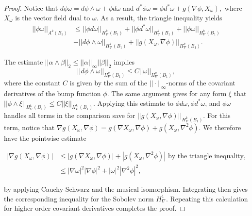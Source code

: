 \begin{proof}
Notice that $d\phi\omega = d\phi\wedge\omega + \phi d \omega$ and $d^*\phi\omega = \phi d^*\omega + g(\nabla \phi, X_{\omega}),$ where $X_{\omega}$ is the vector field dual to $\omega$.
As a result, the triangle inequality yields \begin{align*}
||\phi\omega||_{A^k(B_1)} &\leq ||\phi d\omega||_{H^k_{\nabla}(B_1)} + ||\phi d^*\omega||_{H^k_{\nabla}(B_1)}+ ||\phi\omega||_{H^k_{\nabla}(B_1)} \\ &+ ||d\phi\wedge\omega||_{H^{k}_{\nabla}(B_1)} + ||g(X_{\omega},\nabla\phi)||_{H^k_{\nabla}(B_1)}.
\end{align*}

The estimate $||\alpha\wedge\beta||_2\leq ||\alpha||_{\infty}||\beta||_2$ implies $$||d\phi\wedge\omega||_{H^k_{\nabla}(B_1)} \leq C||\omega||_{H^k_{\nabla}(B_1)},$$ where the constant $C$ is given by the sum of the $||\cdot||_{\infty}$-norms of the covariant derivatives of the bump function $\phi$.
The same argument gives for any form $\xi$ that $||\phi\wedge\xi||_{H^k_{\nabla}(B_1)}\leq C ||\xi||_{H^k_{\nabla}(B_1)}$. Applying this estimate to $\phi d\omega, \phi d^*\omega$, and $\phi \omega$ handles all terms in the comparison save for $||g(X_{\omega},\nabla\phi)||_{H^{k}_{\nabla}(B_1)}$.
For this term, notice that $\nabla g(X_{\omega},\nabla\phi) = g(\nabla X_{\omega},\nabla \phi) + g( X_{\omega}, \nabla^2\phi).$ We therefore have the pointwise estimate

\begin{align*}
|\nabla g(X_{\omega},\nabla\phi) | &\leq |g(\nabla X_{\omega},\nabla \phi)| + |g( X_{\omega}, \nabla^2\phi)| \text{ by the triangle inequality,} \\
&\leq |\nabla \omega|^2|\nabla\phi|^2 + |\omega|^2|\nabla^2\phi|^2,
\end{align*}

by applying Cauchy-Schwarz and the musical isomorphism.
Integrating then gives the corresponding inequality for the Sobolev norm $H^1_{\nabla}$. Repeating this calculation for higher order covariant derivatives completes the proof.
\end{proof}

